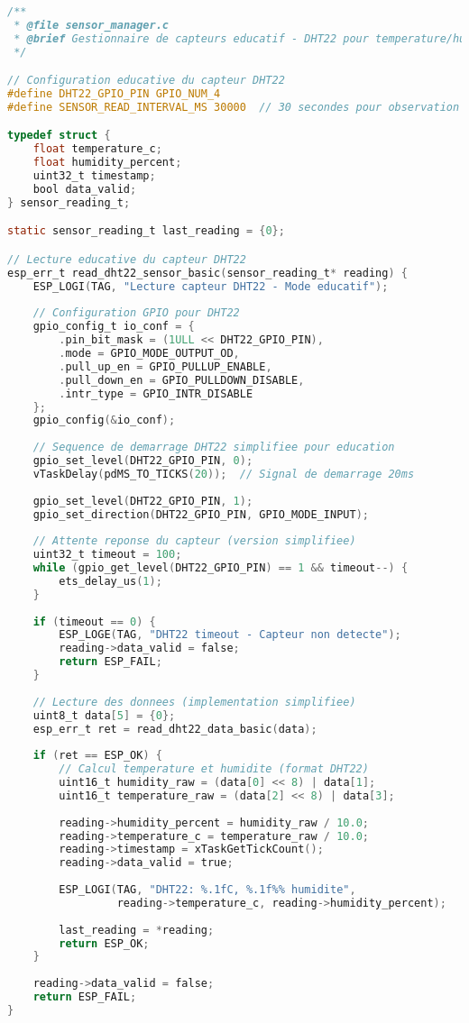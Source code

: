 \begin{lstlisting}[language=C, caption={Interface capteur educative - sensor\_manager.c}, label=lst:sensor-manager]
/**
 * @file sensor_manager.c
 * @brief Gestionnaire de capteurs educatif - DHT22 pour temperature/humidite  
 */

// Configuration educative du capteur DHT22
#define DHT22_GPIO_PIN GPIO_NUM_4
#define SENSOR_READ_INTERVAL_MS 30000  // 30 secondes pour observation

typedef struct {
    float temperature_c;
    float humidity_percent;
    uint32_t timestamp;
    bool data_valid;
} sensor_reading_t;

static sensor_reading_t last_reading = {0};

// Lecture educative du capteur DHT22
esp_err_t read_dht22_sensor_basic(sensor_reading_t* reading) {
    ESP_LOGI(TAG, "Lecture capteur DHT22 - Mode educatif");
    
    // Configuration GPIO pour DHT22
    gpio_config_t io_conf = {
        .pin_bit_mask = (1ULL << DHT22_GPIO_PIN),
        .mode = GPIO_MODE_OUTPUT_OD,
        .pull_up_en = GPIO_PULLUP_ENABLE,
        .pull_down_en = GPIO_PULLDOWN_DISABLE,
        .intr_type = GPIO_INTR_DISABLE
    };
    gpio_config(&io_conf);
    
    // Sequence de demarrage DHT22 simplifiee pour education
    gpio_set_level(DHT22_GPIO_PIN, 0);
    vTaskDelay(pdMS_TO_TICKS(20));  // Signal de demarrage 20ms
    
    gpio_set_level(DHT22_GPIO_PIN, 1);
    gpio_set_direction(DHT22_GPIO_PIN, GPIO_MODE_INPUT);
    
    // Attente reponse du capteur (version simplifiee)
    uint32_t timeout = 100;
    while (gpio_get_level(DHT22_GPIO_PIN) == 1 && timeout--) {
        ets_delay_us(1);
    }
    
    if (timeout == 0) {
        ESP_LOGE(TAG, "DHT22 timeout - Capteur non detecte");
        reading->data_valid = false;
        return ESP_FAIL;
    }
    
    // Lecture des donnees (implementation simplifiee)
    uint8_t data[5] = {0};
    esp_err_t ret = read_dht22_data_basic(data);
    
    if (ret == ESP_OK) {
        // Calcul temperature et humidite (format DHT22)
        uint16_t humidity_raw = (data[0] << 8) | data[1];
        uint16_t temperature_raw = (data[2] << 8) | data[3];
        
        reading->humidity_percent = humidity_raw / 10.0;
        reading->temperature_c = temperature_raw / 10.0;
        reading->timestamp = xTaskGetTickCount();
        reading->data_valid = true;
        
        ESP_LOGI(TAG, "DHT22: %.1fC, %.1f%% humidite", 
                 reading->temperature_c, reading->humidity_percent);
        
        last_reading = *reading;
        return ESP_OK;
    }
    
    reading->data_valid = false;
    return ESP_FAIL;
}
\end{lstlisting}

